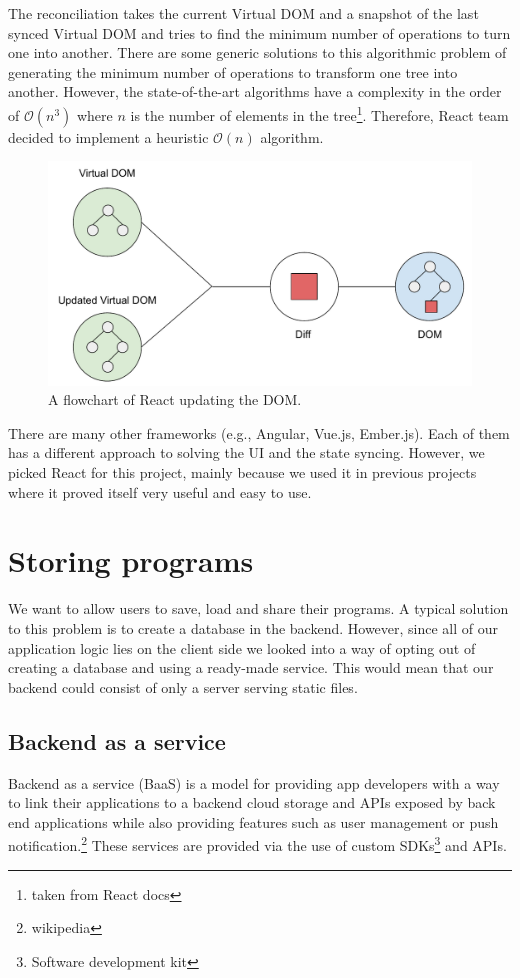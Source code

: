 The reconciliation takes the current Virtual DOM and a snapshot of the last synced Virtual DOM and tries to find the minimum number of operations to turn
one into another. There are some generic solutions to this algorithmic problem of generating the minimum number of operations to transform one tree into another.
However, the state-of-the-art algorithms \cite{TreeEditDistance} have a complexity in the order of $\mathcal{O}(n^3)$ where $n$ is the number of elements in
the tree\footnote{taken from React docs}. Therefore, React team decided to implement a heuristic $\mathcal{O}(n)$ algorithm.

\begin{figure}[!hbt]
    \centering
	\includegraphics[width=\textwidth]{../img/virtual_dom}
	\caption{A flowchart of React updating the DOM.}
	\label{fig:chap2:virtual_dom}
\end{figure}

There are many other frameworks (e.g., Angular, Vue.js, Ember.js). Each of them has a different approach to solving the UI and the state syncing. However, we picked
React for this project, mainly because we used it in previous projects where it proved itself very useful and easy to use.

\section{Storing programs}
We want to allow users to save, load and share their programs. A typical solution to this problem is to create a database in the backend. However, since all
of our application logic lies on the client side we looked into a way of opting out of creating a database and using a ready-made service. This would mean that
our backend could consist of only a server serving static files.

\subsection{Backend as a service}
Backend as a service (BaaS) is a model for providing app developers with a way to link their applications to a backend cloud storage and APIs exposed by back end
applications while also providing features such as user management or push notification.\footnote{wikipedia} These services are provided via the use of custom
SDKs\footnote{Software development kit} and APIs.

